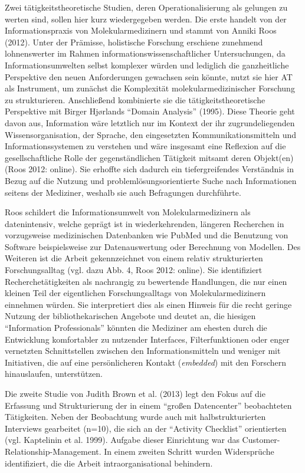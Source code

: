 \documentclass[a4paper,
fontsize=11pt,
oneside,
numbers=noperiodatend,
parskip=half-,
bibliography=totoc,
final
]{scrartcl}
\begin{document}
Zwei tätigkeitstheoretische Studien, deren Operationalisierung als
gelungen zu werten sind, sollen hier kurz wiedergegeben werden. Die
erste handelt von der Informationspraxis von Molekularmedizinern und
stammt von Anniki Roos (2012). Unter der Prämisse, holistische Forschung
erschiene zunehmend lohnenswerter im Rahmen
informationswissenschaftlicher Untersuchungen, da Informationsumwelten
selbst komplexer würden und lediglich die ganzheitliche Perspektive den
neuen Anforderungen gewachsen sein könnte, nutzt sie hier AT als
Instrument, um zunächst die Komplexität molekularmedizinischer Forschung
zu strukturieren. Anschließend kombinierte sie die
tätigkeitstheoretische Perspektive mit Birger Hjørlands \enquote{Domain
Analysis} (1995). Diese Theorie geht davon aus, Information wäre
letztlich nur im Kontext der ihr zugrundeliegenden Wissensorganisation,
der Sprache, den eingesetzten Kommunikationsmitteln und
Informationssystemen zu verstehen und wäre insgesamt eine Reflexion auf
die gesellschaftliche Rolle der gegenständlichen Tätigkeit mitsamt deren
Objekt(en) (Roos 2012: online). Sie erhoffte sich dadurch ein
tiefergreifendes Verständnis in Bezug auf die Nutzung und
problemlösungsorientierte Suche nach Informationen seitens der
Mediziner, weshalb sie auch Befragungen durchführte.

Roos schildert die Informationsumwelt von Molekularmedizinern als
datenintensiv, welche geprägt ist in wiederkehrenden, längeren
Recherchen in vorzugsweise medizinischen Datenbanken wie PubMed und die
Benutzung von Software beispielsweise zur Datenauswertung oder
Berechnung von Modellen. Des Weiteren ist die Arbeit gekennzeichnet von
einem relativ strukturierten Forschungsalltag (vgl. dazu Abb. 4, Roos
2012: online). Sie identifiziert Recherchetätigkeiten als nachrangig zu
bewertende Handlungen, die nur einen kleinen Teil der eigentlichen
Forschungsalltags von Molekularmedizinern einnehmen würden. Sie
interpretiert dies als einen Hinweis für die recht geringe Nutzung der
bibliothekarischen Angebote und deutet an, die hiesigen
\enquote{Information Professionals} könnten die Mediziner am ehesten
durch die Entwicklung komfortabler zu nutzender Interfaces,
Filterfunktionen oder enger vernetzten Schnittstellen zwischen den
Informationsmitteln und weniger mit Initiativen, die auf eine
persönlicheren Kontakt (\emph{embedded}) mit den Forschern hinauslaufen,
unterstützen.

Die zweite Studie von Judith Brown et al. (2013) legt den Fokus auf die
Erfassung und Strukturierung der in einem \enquote{großen Datencenter}
beobachteten Tätigkeiten. Neben der Beobachtung wurde auch mit
halbstrukturierten Interviews gearbeitet (n=10), die sich an der
\enquote{Activity Checklist} orientierten (vgl. Kaptelinin et al. 1999).
Aufgabe dieser Einrichtung war das Customer-Relationship-Management. In
einem zweiten Schritt wurden Widersprüche identifiziert, die die Arbeit
intraorganisational behindern.
\end{document}
